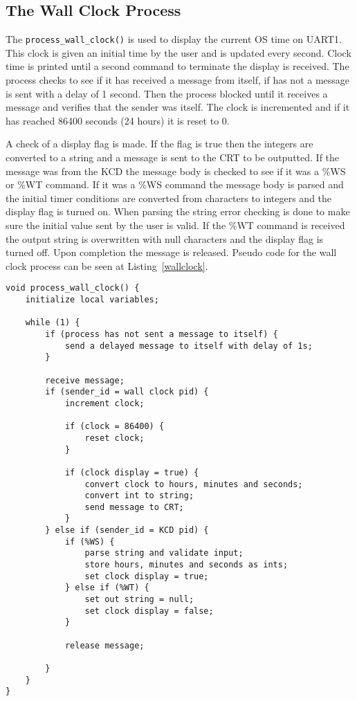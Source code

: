 \documentclass[oneside]{article}
\begin{document}
\subsection*{The Wall Clock Process}

The \texttt{process\_wall\_clock()} is used to display the current OS time on
UART1. This clock is given an initial time by the user and is updated every
second. Clock time is printed until a second command to terminate the display
is received.  The process checks to see if it has received a message from
itself, if has not a message is sent with a delay of 1 second. Then the process
blocked until it receives a message and verifies that the sender was itself.
The clock is incremented and if it has reached 86400 seconds (24 hours) it is
reset to 0. 

A check of a display flag is made. If the flag is true then the integers are
converted to a string and a message is sent to the CRT to be outputted.  If the
message was from the KCD the message body is checked to see if it was a \%WS or
\%WT command. If it was a \%WS command the message body is parsed and the
initial timer conditions are converted from characters to integers and the
display flag is turned on. When parsing the string error checking is done to
make sure the initial value sent by the user is valid. If the \%WT command is
received the output string is overwritten with null characters and the display
flag is turned off. Upon completion the message is released. Pseudo code for
the wall clock process can be seen at Listing~\ref{wallclock}.

\begin{lstlisting}
void process_wall_clock() {
    initialize local variables;

    while (1) {
        if (process has not sent a message to itself) {
            send a delayed message to itself with delay of 1s;
        }
        
        receive message;
        if (sender_id = wall clock pid) {
            increment clock;

            if (clock = 86400) {
                reset clock;
            }
            
            if (clock display = true) {
                convert clock to hours, minutes and seconds;
                convert int to string;
                send message to CRT;
            }
        } else if (sender_id = KCD pid) {
            if (%WS) {
                parse string and validate input;
                store hours, minutes and seconds as ints;
                set clock display = true;
            } else if (%WT) {
                set out string = null;
                set clock display = false;
            }
            
            release message;        

        }
    }
}
\end{lstlisting}
\end{document}
